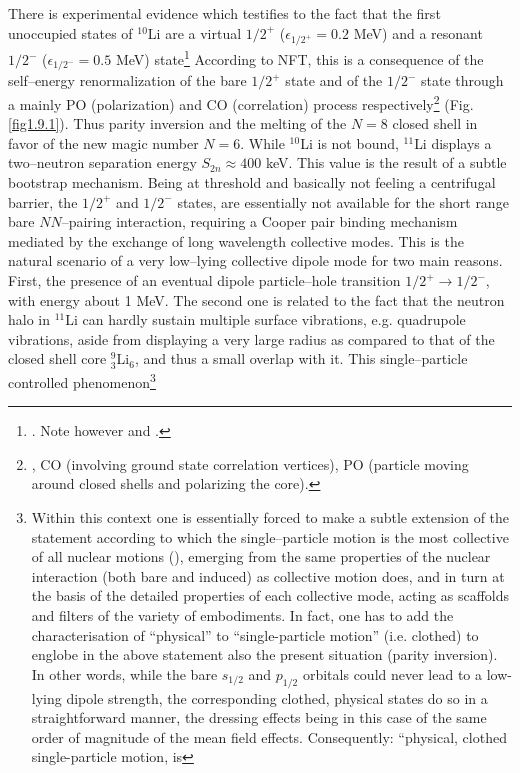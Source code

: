 There is  experimental evidence which testifies to the fact that the first unoccupied states of $^{10}$Li are a virtual $1/2^+$ ($\epsilon_{1/2^+}=0.2$ MeV) and a resonant $1/2^-$ ($\epsilon_{1/2^-}=0.5$ MeV) state\footnote{\cite{Zinser:95}. Note however \cite{Cavallaro:17} and \cite{Sanetullaev:16}.}   According to NFT, this is a consequence of the self--energy renormalization of the bare $1/2^+$ state and of the $1/2^-$ state through a mainly PO (polarization) and CO (correlation) process respectively\footnote{\cite{Barranco:01}, CO (involving ground state correlation vertices), PO (particle moving around closed shells and polarizing the core).} (Fig. \ref{fig1.9.1}). Thus parity inversion and the melting of  the $N=8$ closed shell in favor of the new magic number $N=6$. While $^{10}$Li is not bound, $^{11}$Li displays a two--neutron separation energy $S_{2n}\approx400$ keV.  This value  is the result of a subtle bootstrap mechanism. Being at threshold and basically not feeling a centrifugal barrier, the $1/2^+$ and $1/2^-$ states, are essentially not available for the short range bare $NN$--pairing interaction, requiring a Cooper pair binding mechanism mediated by  the exchange of  long wavelength collective modes. This is the natural scenario of a very low--lying collective dipole mode for two main reasons. First, the presence of an eventual dipole particle--hole transition $1/2^+\rightarrow 1/2^-$, with energy about 1 MeV. The second one is related to  the fact that the neutron halo in $^{11}$Li can hardly sustain multiple surface vibrations, e.g. quadrupole vibrations, aside from displaying a very large radius as compared to that of the closed shell core $^9_3$Li$_6$, and thus a small overlap with it. This single--particle controlled phenomenon\footnote{Within this context one is essentially forced to make a subtle  extension of the statement according to which  the single--particle motion is the most collective  
of all nuclear motions (\cite{Mottelson:62}), emerging from  the same properties  of the nuclear interaction 
(both bare and induced) as collective motion does, 
and in turn at the basis of the detailed properties of each collective mode, acting as
 scaffolds and filters of the variety of embodiments. In fact, one 
has  to add the characterisation of ``physical'' to ``single-particle motion'' (i.e. clothed) to englobe in  the above statement 
also the present  situation (parity inversion). In other words, while the bare $s_{1/2}$ and $p_{1/2}$ orbitals could never lead to a low-lying dipole strength, the corresponding 
 clothed, physical states do so in a straightforward manner, the dressing effects being in this case of the same order of magnitude of the mean field effects. Consequently: ``physical,  clothed single-particle motion, is 
}

